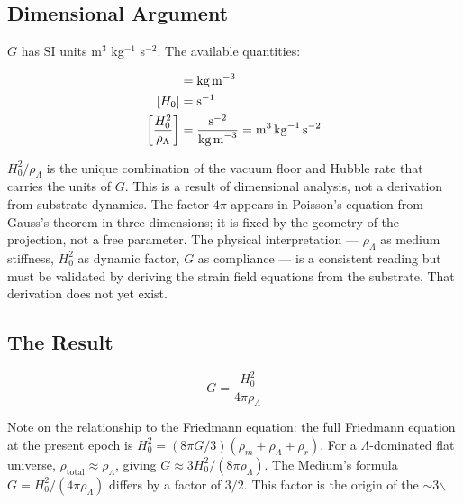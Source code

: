 \documentclass[11pt,letterpaper]{article}
\begin{document}
\subsection{Dimensional Argument}
\label{sec:orgef05706}

\(G\) has SI units m\(^3\) kg\(^{-1}\) s\(^{-2}\). The available quantities:

\begin{align*}
[\rho_\Lambda] &= \text{kg\,m}^{-3}\\
[H_0] &= \text{s}^{-1}\\
\left[\frac{H_0^2}{\rho_\Lambda}\right] &= \frac{\text{s}^{-2}}{\text{kg\,m}^{-3}} = \text{m}^3\,\text{kg}^{-1}\,\text{s}^{-2}
\end{align*}

\(H_0^2/\rho_\Lambda\) is the unique combination of the vacuum floor and Hubble rate that carries the units of \(G\). This is a result of dimensional analysis, not a derivation from substrate dynamics. The factor \(4\pi\) appears in Poisson's equation from Gauss's theorem in three dimensions; it is fixed by the geometry of the projection, not a free parameter. The physical interpretation --- \(\rho_\Lambda\) as medium stiffness, \(H_0^2\) as dynamic factor, \(G\) as compliance --- is a consistent reading but must be validated by deriving the strain field equations from the substrate. That derivation does not yet exist.

\subsection{The Result}
\label{sec:org2d561c3}

\begin{equation}
\boxed{G = \frac{H_0^2}{4\pi\rho_\Lambda}}
\end{equation}

Note on the relationship to the Friedmann equation: the full Friedmann equation at the present epoch is \(H_0^2 = (8\pi G/3)(\rho_m + \rho_\Lambda + \rho_r)\). For a \(\Lambda\)-dominated flat universe, \(\rho_\text{total} \approx \rho_\Lambda\), giving \(G \approx 3H_0^2/(8\pi\rho_\Lambda)\). The Medium's formula \(G = H_0^2/(4\pi\rho_\Lambda)\) differs by a factor of \(3/2\). This factor is the origin of the \(\sim\)3$\backslash$%
\end{document}

